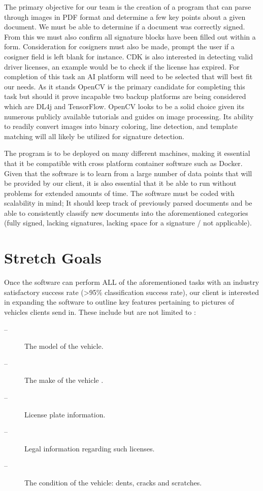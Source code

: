 \documentclass[onecolumn, draftclsnofoot,10pt, compsoc]{IEEEtran}
\begin{document}
The primary objective for our team is the creation of a program that can parse through images in PDF format and determine a few key points about a given document. We must be able to determine if a document was correctly signed. From this we must also confirm all signature blocks have been filled out within a form. Consideration for cosigners must also be made, prompt the user if a cosigner field is left blank for instance. CDK is also interested in detecting valid driver licenses, an example would be to check if the license has expired.
For completion of this task an AI platform will need to be selected that will best fit our needs. As it stands OpenCV is the primary candidate for completing this task but should it prove incapable two backup platforms are being considered which are DL4j and TensorFlow. OpenCV looks to be a solid choice given its numerous publicly available tutorials and guides on image processing. Its ability to readily convert images into binary coloring, line detection, and template matching will all likely be utilized for signature detection.

 The program is to be deployed on many different machines, making it essential that it be compatible with cross platform container software such as Docker. Given that the software is to learn from a large number of data points that will be provided by our client, it is also essential that it be able to run without problems for extended amounts of time. The software must be coded with scalability in mind; It should keep track of previously parsed documents and be able to consistently classify new documents into the aforementioned categories (fully signed, lacking signatures, lacking space for a signature / not applicable). 

\pagebreak

\section{Stretch Goals}
	
	Once the software can perform ALL of the aforementioned tasks with an industry satisfactory success rate (>95\% classification success rate), our client is interested in expanding the software to outline key features pertaining to pictures of vehicles clients send in. These include but are not limited to :
\begin{description}
	\item[--]The model of the vehicle.
	\item[--]The make of the vehicle .
	\item[--]License plate information.
	\item[--]Legal information regarding such licenses.
	\item[--]The condition of the vehicle: dents, cracks and scratches.
\end{description}
\end{document}
